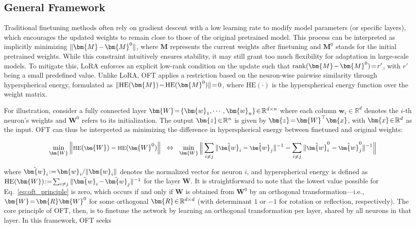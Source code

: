 \subsection{General Framework}

Traditional finetuning methods often rely on gradient descent with a low learning rate to modify model parameters (or specific layers), which encourages the updated weights to remain close to those of the original pretrained model. This process can be interpreted as implicitly minimizing $\thickmuskip=2mu \medmuskip=2mu \| \bm{M} - \bm{M}^0\|$, where $\bm{M}$ represents the current weights after finetuning and $\bm{M}^0$ stands for the initial pretrained weights. While this constraint intuitively ensures stability, it may still grant too much flexibility for adaptation in large-scale models. To mitigate this, LoRA enforces an explicit low-rank condition on the update such that $\thickmuskip=2mu \medmuskip=2mu \text{rank}(\bm{M} - \bm{M}^0)=r'$, with $r'$ being a small predefined value. Unlike LoRA, OFT applies a restriction based on the neuron-wise pairwise similarity through hyperspherical energy, formulated as $\thickmuskip=2mu \medmuskip=2mu \| \text{HE}(\bm{M})-\text{HE}(\bm{M}^0) \|=0$, where $\text{HE}(\cdot)$ is the hyperspherical energy function over the weight matrix. 

For illustration, consider a fully connected layer $\thickmuskip=2mu \medmuskip=2mu \bm{W}=\{\bm{w}_1,\cdots,\bm{w}_n\}\in\mathbb{R}^{d\times n}$ where each column $\bm{w}_i\in\mathbb{R}^{d}$ denotes the $i$-th neuron's weights and $\bm{W}^0$ refers to its initialization. The output $\thickmuskip=2mu \medmuskip=2mu \bm{z}\in\mathbb{R}^n$ is given by $\thickmuskip=2mu \medmuskip=2mu \bm{z}=\bm{W}^\top\bm{x}$, with $\thickmuskip=2mu \medmuskip=2mu \bm{x}\in\mathbb{R}^d$ as the input. OFT can thus be interpreted as minimizing the difference in hyperspherical energy between finetuned and original weights:

\begin{equation}\label{eq:oft_principle}
\footnotesize
\min_{\bm{W}} \left\| \text{HE}(\bm{W})-\text{HE}(\bm{W}^0)\right\|~~\Leftrightarrow~~\min_{\bm{W}} \bigg{\|} \sum_{i\neq j} \|\hat{\bm{w}}_i-\hat{\bm{w}}_j\|^{-1}-\sum_{i\neq j} \|\hat{\bm{w}}^0_i-\hat{\bm{w}}^0_j\|^{-1}\bigg{\|}
\end{equation}

where $\thickmuskip=2mu \medmuskip=2mu \hat{\bm{w}}_i:=\bm{w}_i/\|\bm{w}_i\|$ denotes the normalized vector for neuron $i$, and hyperspherical energy is defined as $\thickmuskip=2mu \medmuskip=2mu \text{HE}(\bm{W}):= \sum_{i\neq j} \|\hat{\bm{w}}_i-\hat{\bm{w}}_j\|^{-1}$ for the layer $\bm{W}$. It is straightforward to note that the lowest value possible for Eq.~\eqref{eq:oft_principle} is zero, which occurs if and only if $\bm{W}$ is obtained from $\bm{W}^0$ by an orthogonal transformation—i.e., $\thickmuskip=2mu \medmuskip=2mu \bm{W}=\bm{R}\bm{W}^0$ for some orthogonal $\thickmuskip=2mu \medmuskip=2mu \bm{R}\in\mathbb{R}^{d\times d}$ (with determinant $1$ or $-1$ for rotation or reflection, respectively). The core principle of OFT, then, is to finetune the network by learning an orthogonal transformation per layer, shared by all neurons in that layer. In this framework, OFT seeks

